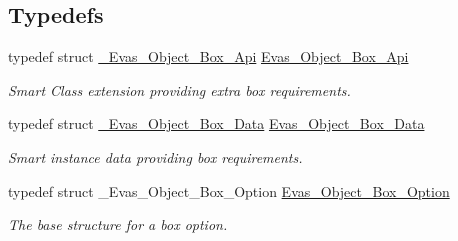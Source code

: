 \subsection*{Typedefs}
\begin{DoxyCompactItemize}
\item 
typedef struct \hyperlink{struct__Evas__Object__Box__Api}{\_\-Evas\_\-Object\_\-Box\_\-Api} \hyperlink{group__Evas__Object__Box_ga2a8fbeeab4f5ae23e7bc1b291e27c5e1}{Evas\_\-Object\_\-Box\_\-Api}\label{group__Evas__Object__Box_ga2a8fbeeab4f5ae23e7bc1b291e27c5e1}

\begin{DoxyCompactList}\small\item\em Smart Class extension providing extra box requirements. \item\end{DoxyCompactList}\item 
typedef struct \hyperlink{struct__Evas__Object__Box__Data}{\_\-Evas\_\-Object\_\-Box\_\-Data} \hyperlink{group__Evas__Object__Box_gac9047b7cff95df59f61c7321967caf7b}{Evas\_\-Object\_\-Box\_\-Data}\label{group__Evas__Object__Box_gac9047b7cff95df59f61c7321967caf7b}

\begin{DoxyCompactList}\small\item\em Smart instance data providing box requirements. \item\end{DoxyCompactList}\item 
typedef struct \_\-Evas\_\-Object\_\-Box\_\-Option \hyperlink{group__Evas__Object__Box_gabbeb05bf47aaf7681e9d83a1b0055d20}{Evas\_\-Object\_\-Box\_\-Option}\label{group__Evas__Object__Box_gabbeb05bf47aaf7681e9d83a1b0055d20}

\begin{DoxyCompactList}\small\item\em The base structure for a box option. \item\end{DoxyCompactList}\end{DoxyCompactItemize}
